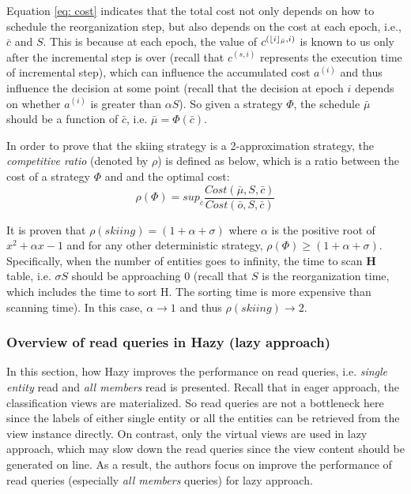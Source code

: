 Equation \ref{eq: cost} indicates that the total cost not only depends on how to schedule the reorganization step, but also depends on the cost at each epoch, i.e., $\bar{c}$ and $S$. This is because at each epoch, the value of $c^{(\lfloor i\rfloor_{\bar{\mu}}, i)}$ is known to us only after the incremental step is over (recall that $c^{(s,i)}$ represents the execution time of incremental step), which can influence the accumulated cost $a^{(i)}$ and thus influence the decision at some point (recall that the decision at epoch $i$ depends on whether $a^{(i)}$ is greater than $\alpha S$). So given a strategy $\Phi$, the schedule $\bar{\mu}$ should be a function of $\bar{c}$, i.e. $\bar{\mu} = \Phi(\bar{c})$.

In order to prove that the skiing strategy is a 2-approximation strategy, the {\em competitive ratio} (denoted by $\rho$) is defined as below, which is a ratio between the cost of a strategy $\Phi$ and and the optimal cost:
\begin{equation}
    \rho(\Phi) = sup_{\bar{c}}\frac{Cost(\bar{\mu}, S, \bar{c})}{Cost(\bar{o}, S, \bar{c})}
\end{equation}


It is proven that $\rho(skiing) = (1+\alpha + \sigma)$ where $\alpha$ is the positive root of $x^2 + \alpha x - 1$ and for any other deterministic strategy, $\rho(\Phi) \geq (1+\alpha + \sigma)$. Specifically, when the number of entities goes to infinity, the time to scan $\textbf{H}$ table, i.e. $\sigma S$ should be approaching 0 (recall that $S$ is the reorganization time, which includes the time to sort $\text{H}$. The sorting time is more expensive than scanning time). In this case, $\alpha \rightarrow 1$ and thus $\rho(skiing) \rightarrow 2$.

\subsubsection{Overview of read queries in Hazy (lazy approach)}
In this section, how Hazy improves the performance on read queries, i.e. {\em single entity} read and {\em all members} read is presented. Recall that in eager approach, the classification views are materialized. So read queries are not a bottleneck here since the labels of either single entity or all the entities can be retrieved from the view instance directly. On contrast, only the virtual views are used in lazy approach, which may slow down the read queries since the view content should be generated on line. As a result, the authors focus on improve the performance of read queries (especially {\em all members} queries) for lazy approach.

